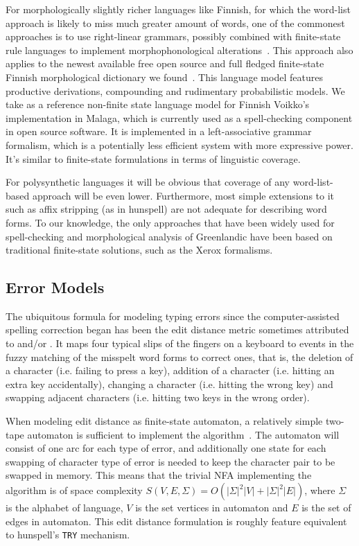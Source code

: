 \documentclass[11pt]{article}
\begin{document}
For morphologically slightly richer languages like Finnish, for which the
word-list approach is likely to miss much greater amount of words, one of the
commonest approaches is to use right-linear grammars, possibly combined with
finite-state rule languages to implement morphophonological
alterations~\cite{koskenniemi/1983}. This approach also applies to the newest
available free open source and full fledged finite-state Finnish morphological
dictionary we found~\cite{pirinen/2011/nodalida}. This language model features
productive derivations, compounding and rudimentary probabilistic models.
We take as a reference non-finite state language model for Finnish Voikko's
implementation in Malaga, which is currently used as a spell-checking component
in open source software. It is implemented in a left-associative grammar
formalism, which is a potentially less efficient system with more expressive
power. It's similar to finite-state formulations in terms of linguistic coverage.

For polysynthetic languages it will be obvious that coverage of any
word-list-based approach will be even lower. Furthermore, most simple extensions
to it such as affix stripping (as in hunspell) are not adequate for describing
word forms. To our knowledge, the only approaches that have
been widely used for spell-checking and morphological analysis of Greenlandic
have been based on traditional finite-state solutions, such as the Xerox formalisms.

\subsection{Error Models}
\label{subsec:error-models}

The ubiquitous formula for modeling typing errors since the computer-assisted
spelling correction began has been the edit distance metric sometimes
attributed to  and/or
. It maps four
typical slips of the fingers on a keyboard to events in the fuzzy matching of the
misspelt word forms to correct ones, that is, the deletion of a character
(i.e. failing to
press a key), addition of a character (i.e. hitting an extra key
accidentally), changing a character (i.e. hitting the wrong key) and swapping
adjacent characters (i.e. hitting two keys in the wrong order).

When modeling edit
distance as finite-state automaton, a relatively simple two-tape automaton is
sufficient to implement the algorithm~\cite{hassan/2008}. The automaton
will consist of one arc for each type of error, and additionally one state for each
swapping of character type of error is needed to keep the character pair to be
swapped in memory. This means that the trivial NFA implementing the algorithm
is of space complexity $S(V, E, \Sigma) = O(|\Sigma|^2 |V| + |\Sigma|^2 |E|)$,
where $\Sigma$ is the alphabet of language, $V$ is the set vertices in
automaton and $E$ is the set of edges in automaton.  This edit distance
formulation is roughly feature equivalent to hunspell's \texttt{TRY} mechanism.
\end{document}

